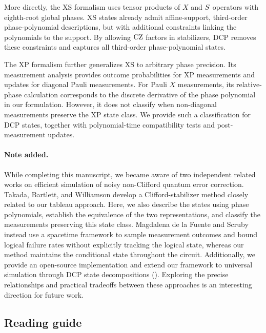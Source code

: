 More directly, the XS formalism \cite{ni2015noncommuting} uses tensor products of $X$ and $\S$ operators with eighth-root global phases. XS states already admit affine-support, third-order phase-polynomial descriptions, but with additional constraints linking the polynomials to the support. By allowing $\CZ$ factors in stabilizers, DCP removes these constraints and captures all third-order phase-polynomial states.

The XP formalism \cite{webster2022xp} further generalizes XS to arbitrary phase precision. Its measurement analysis \cite[Section 7 and Appendix F]{webster2022xp} provides outcome probabilities for XP measurements and updates for diagonal Pauli measurements. For Pauli $X$ measurements, its relative-phase calculation corresponds to the discrete derivative of the phase polynomial in our formulation. However, it does not classify when non-diagonal measurements preserve the XP state class. We provide such a classification for DCP states, together with polynomial-time compatibility tests and post-measurement updates.

\vspace{\baselineskip}
\paragraph*{Note added.}
While completing this manuscript, we became aware of two independent related works on efficient simulation of noisy non-Clifford quantum error correction.
Takada, Bartlett, and Williamson \cite{takada2026exact} develop a Clifford-stabilizer method closely related to our tableau approach.
Here, we also describe the states using phase polynomials, establish the equivalence of the two representations, and classify the measurements preserving this state class.
Magdalena de la Fuente and Scruby \cite{fuente2026efficiently} instead use a spacetime framework to sample measurement outcomes and bound logical failure rates without explicitly tracking the logical state, whereas our method maintains the conditional state throughout the circuit.
Additionally, we provide an open-source implementation and extend our framework to universal simulation through DCP state decompositions ().
Exploring the precise relationships and practical tradeoffs between these approaches is an interesting direction for future work.

\subsection{Reading guide}

